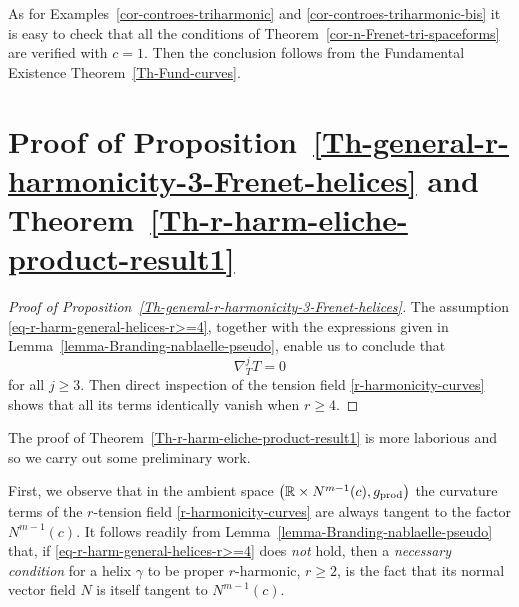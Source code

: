 \documentclass[11pt]{amsart}
\theoremstyle{plain}
\theoremstyle{definition}
\numberwithin{equation}{section}
\def \R{{\mathbb R}}
\begin{document}
As for Examples~\ref{cor-controes-triharmonic} and \ref{cor-controes-triharmonic-bis} it is easy to check that all the conditions of Theorem~\ref{cor-n-Frenet-tri-spaceforms} are verified with $c=1$. Then the conclusion follows from the Fundamental Existence Theorem~\ref{Th-Fund-curves}.

\section{Proof of Proposition~\ref{Th-general-r-harmonicity-3-Frenet-helices} and Theorem~\ref{Th-r-harm-eliche-product-result1}}\label{sec-Lorentzian-product} 
\begin{proof}[Proof of Proposition~\ref{Th-general-r-harmonicity-3-Frenet-helices}] The assumption \eqref{eq-r-harm-general-helices-r>=4}, together with the expressions given in Lemma~\ref{lemma-Branding-nablaelle-pseudo}, enable us to conclude that
\[
\nabla_T^j T=0 
\]
for all $j \geq 3$. Then direct inspection of the tension field \eqref{r-harmonicity-curves} shows that all its terms identically vanish when $r\geq 4$.
\end{proof}
The proof of Theorem~\ref{Th-r-harm-eliche-product-result1} is more laborious and so we carry out some preliminary work. 

First, we observe that in the ambient space $\left ( \R \times N^{m-1}(c),g_{{\rm prod}}\right )$ the curvature terms of the $r$-tension field  \eqref{r-harmonicity-curves} are always tangent to the factor $N^{m-1}(c)$.
It follows readily from Lemma~\ref{lemma-Branding-nablaelle-pseudo} that, if \eqref{eq-r-harm-general-helices-r>=4} does \textit{not} hold, then a \textit{necessary condition} for a helix $\gamma$ to be proper $r$-harmonic, $r \geq 2$, is the fact that its normal vector field $N$ is itself tangent to $N^{m-1}(c)$.
\end{document}
